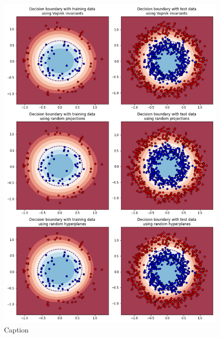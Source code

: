 \begin{figure}
    \centering
    \includegraphics[width=\textwidth]{thesis/Figures/circles_decision_boundaries_ecoc.png}
    \caption{Caption}
    \label{fig:circles_decision_boundary_ecoc}
\end{figure}

